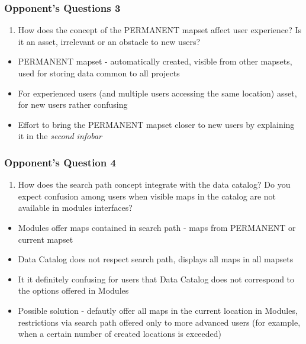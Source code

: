 \documentclass[aspectratio=169]{beamer}
\begin{document}
\begin{frame}
\frametitle{Opponent's Questions 3}
\begin{enumerate}\addtocounter{enumi}{2}
\item{How does the concept of the PERMANENT mapset affect user experience? Is it an asset, irrelevant or an obstacle to new users?}
\end{enumerate}
\begin{itemize}
\vspace{0.3cm}
\item{PERMANENT mapset - automatically created, visible from other mapsets, used for storing data common to all projects}
\item{For experienced users (and multiple users accessing the same location) asset, for new users rather confusing}
\item{Effort to bring the PERMANENT mapset closer to new users by explaining it in the \textit{second infobar}}
\end{itemize}
\end{frame}

\begin{frame}
\frametitle{Opponent's Question 4}
\begin{enumerate}\addtocounter{enumi}{3}
\item{How does the search path concept integrate with the data catalog? Do you expect confusion among users when visible maps in the catalog are not available in modules interfaces?}
\end{enumerate}
\begin{itemize}
\vspace{0.3cm}
\item{Modules offer maps contained in search path - maps from PERMANENT or current mapset}
\item{Data Catalog does not respect search path, displays all maps in all mapsets}
\item{It it definitely confusing for users that Data Catalog does not correspond to the options offered in Modules} 
\item{Possible solution - defautly offer all maps in the current location in Modules, restrictions via search path offered only to more advanced users (for example, when a certain number of created locations is exceeded)}
\end{itemize}
\end{frame}
\end{document}
